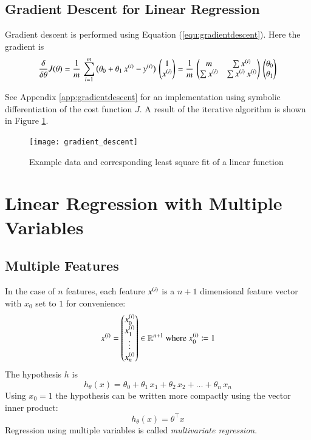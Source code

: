 \documentclass[a4paper,twoside,10pt]{article}
\begin{document}
\subsection{Gradient Descent for Linear Regression}
Gradient descent is performed using Equation (\ref{equ:gradientdescent}). Here the gradient is
\begin{equation*}
  \frac{\delta}{\delta\theta}J(\theta)=
  \frac{1}{m}\,\displaystyle\sum_{i=1}^m\big(\theta_0+\theta_1\,x^{(i)}-y^{(i)}\big)\,\begin{pmatrix}1\\x^{(i)}\end{pmatrix}=
  \frac{1}{m}\,\begin{pmatrix}m&\sum x^{(i)}\\\sum x^{(i)}&\sum x^{(i)}\,x^{(i)}\end{pmatrix}\,
  \begin{pmatrix}\theta_0\\\theta_1\end{pmatrix}
\end{equation*}

See Appendix \ref{app:gradientdescent} for an implementation using symbolic differentiation of the cost function $J$.
A result of the iterative algorithm is shown in Figure \ref{fig:gradient_descent}.
\begin{figure}[htbp]
  \begin{center}
    \texttt{[image: gradient\_descent]}
    \caption{Example data and corresponding least square fit of a linear function\label{fig:gradient_descent}}
  \end{center}
\end{figure}

\section{Linear Regression with Multiple Variables}
\subsection{Multiple Features}
In the case of $n$ features, each feature $x^{(i)}$ is a $n+1$ dimensional feature vector with $x_0$ set to $1$ for convenience:
\begin{equation*}
  x^{(i)}=\begin{pmatrix}x^{(i)}_0\\x^{(i)}_1\\\vdots\\x^{(i)}_n\end{pmatrix}\in\mathbb{R}^{n+1}
  \mathrm{\ where\ }x^{(i)}_0\coloneqq 1
\end{equation*}
The hypothesis $h$ is
\begin{equation*}
  h_\theta(x)=\theta_0+\theta_1\,x_1+\theta_2\,x_2+\ldots+\theta_n\,x_n
\end{equation*}
Using $x_0=1$ the hypothesis can be written more compactly using the vector inner product:
\begin{equation*}
  h_\theta(x)=\theta^\top x
\end{equation*}
Regression using multiple variables is called \emph{multivariate regression}.
\end{document}
